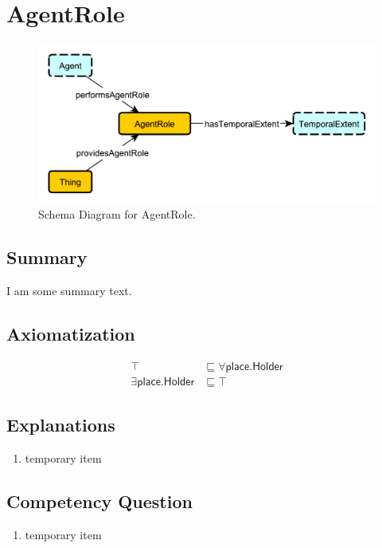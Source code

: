 \section{AgentRole}
\label{sec:AgentRole}
\begin{figure}[h!]
\begin{center}
\includegraphics[width=.4\textwidth]{figures/agentrole}
\end{center}
\caption{Schema Diagram for AgentRole.}
\label{fig:AgentRole}
\end{figure}
\subsection{Summary}
\label{sum:AgentRole}
I am some summary text.

\subsection{Axiomatization}
\label{axs:AgentRole}
\begin{align}
\top &\sqsubseteq \forall\textsf{place.Holder} \\ 
\exists\textsf{place.Holder} &\sqsubseteq \top 
\end{align}

\subsection{Explanations}
\label{exp:AgentRole}
\begin{enumerate}
\item temporary item
\end{enumerate}

\subsection{Competency Question}
\label{cqs:AgentRole}
\begin{enumerate}[CQ1.]
\item temporary item
\end{enumerate}

\newpage
